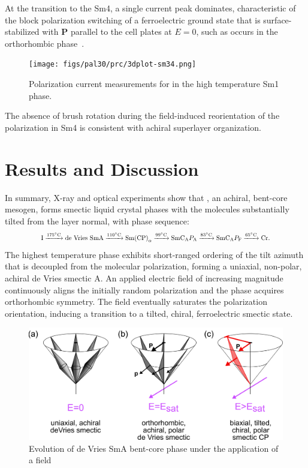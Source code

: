 \documentclass[aagreenthesis]{subfiles}
\begin{document}
At the
transition to the Sm4, a single current peak dominates, characteristic of the block
polarization switching of a ferroelectric ground state that is surface-stabilized
with $\mathbf{P}$ parallel to the cell plates at $E=0$, such as occurs in the orthorhombic  phase~\cite{shen2011effective}.

\begin{figure}[h!]
    \centering
    \texttt{[image: figs/pal30/prc/3dplot-sm34.png]}
    \caption{\label{fig:pal30:sm34:prc1} Polarization current measurements for \nfour{} in the high temperature
    Sm1 phase.}
    \end{figure}
 
The absence of brush rotation during the field-induced reorientation of the
polarization in Sm4 is consistent with achiral  superlayer organization.

\section{Results and Discussion}

In summary, X-ray and optical experiments show that , an achiral, bent-core mesogen, forms smectic
liquid crystal phases with the molecules substantially tilted from the layer
normal, with phase sequence:
$$
    \resizebox{.8\textwidth}{!}{$\text{I} \xrightarrow{
        175\si{\degreeCelsius}} \textrm{de Vries SmA} \xrightarrow{
    110\si{\degreeCelsius}} \textrm{Sm(CP)}_\alpha\xrightarrow{99\si{\degreeCelsius}}
    \smcapa{}
    \xrightarrow{83\si{\degreeCelsius}}\smcapf{}\xrightarrow{65\si{\degreeCelsius}}
\text{Cr}$.}
$$
The highest temperature phase exhibits short-ranged ordering of the
tilt azimuth that is decoupled from the molecular polarization, forming a uniaxial, non-polar, achiral
de Vries smectic A.  An applied electric field of increasing magnitude
continuously aligns the initially random polarization and the phase acquires orthorhombic symmetry. The field eventually saturates the
polarization orientation, inducing a transition to a tilted, chiral, ferroelectric
smectic state.  
\begin{figure}[h!]
    \centering
    \includegraphics[width=\textwidth]{figs/pal30/fromPaper/finalFigs/dvAlign.png}
    \caption{\label{fig:pal30:sm1:align} Evolution of de Vries SmA bent-core
    phase under the application of a field}
\end{figure}
\end{document}

